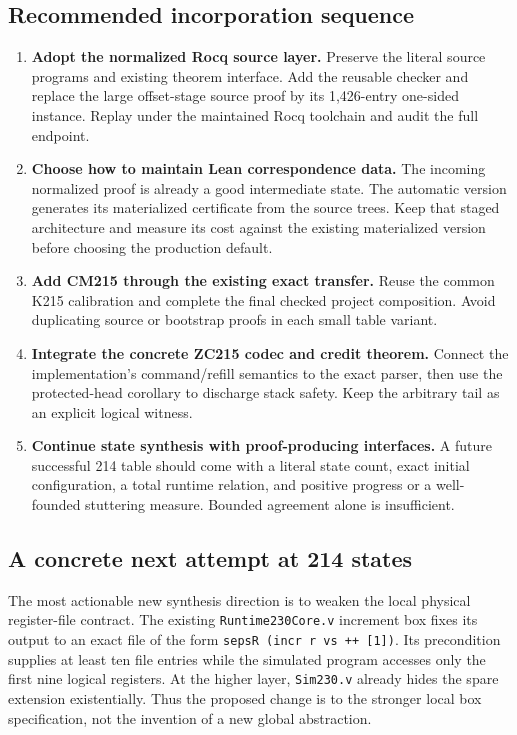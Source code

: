 \documentclass[11pt]{article}
\theoremstyle{definition}\newtheorem{definition}[theorem]{Definition}
\begin{document}
\subsection{Recommended incorporation sequence}

\begin{enumerate}
\item\textbf{Adopt the normalized Rocq source layer.} Preserve the literal
source programs and existing theorem interface. Add the reusable checker and
replace the large offset-stage source proof by its 1,426-entry one-sided
instance. Replay under the maintained Rocq toolchain and audit the full endpoint.
\item\textbf{Choose how to maintain Lean correspondence data.} The incoming
normalized proof is already a good intermediate state. The automatic version
generates its materialized certificate from the source trees. Keep that staged
architecture and measure its cost against the existing materialized version
before choosing the production default.
\item\textbf{Add CM215 through the existing exact transfer.} Reuse the common
K215 calibration and complete the final checked project composition. Avoid
duplicating source or bootstrap proofs in each small table variant.
\item\textbf{Integrate the concrete ZC215 codec and credit theorem.} Connect
the implementation's command/refill semantics to the exact parser, then use
the protected-head corollary to discharge stack safety. Keep the arbitrary
tail as an explicit logical witness.
\item\textbf{Continue state synthesis with proof-producing interfaces.} A
future successful 214 table should come with a literal state count, exact
initial configuration, a total runtime relation, and positive progress or a
well-founded stuttering measure. Bounded agreement alone is insufficient.
\end{enumerate}

\subsection{A concrete next attempt at 214 states}

The most actionable new synthesis direction is to weaken the local physical
register-file contract. The existing \texttt{Runtime230Core.v} increment box
fixes its output to an exact file of the form
\texttt{sepsR (incr r vs ++ [1])}. Its precondition supplies at least ten file
entries while the simulated program accesses only the first nine logical
registers. At the higher layer, \texttt{Sim230.v} already hides the spare
extension existentially. Thus the proposed change is to the stronger local
box specification, not the invention of a new global abstraction.\cite{runtime}
\end{document}
